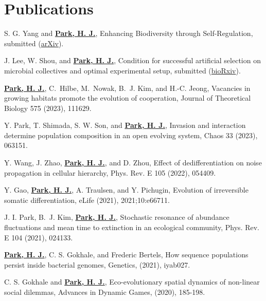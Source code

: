 \documentclass[11pt,a4paper,sans]{moderncv}        %
\begin{document}
\section{Publications}
\renewcommand{\labelenumi}{[\theenumi]} 
\begin{etaremune}
\item
S. G. Yang and \underline{\textbf{Park, H. J.}}, Enhancing Biodiversity through Self-Regulation, submitted (\href{https://arxiv.org/abs/2305.12341}{arXiv}).

\item
J. Lee, W. Shou, and \underline{\textbf{Park, H. J.}}, Condition for successful artificial selection on microbial collectives and optimal experimental setup, submitted (\href{https://www.biorxiv.org/content/10.1101/2023.03.07.531234v1.abstract}{bioRxiv}).

\item
\underline{\textbf{Park, H. J.}}, C.~Hilbe, M.~Nowak, B.~J. Kim, and H.-C. Jeong, Vacancies in growing habitats promote  the evolution of cooperation, Journal of Theoretical Biology 575 (2023), 111629.

\item
Y. Park, T. Shimada, S. W. Son, and \underline{\textbf{Park, H. J.}}, Invasion and interaction determine population composition in an open evolving system, Chaos 33 (2023), 063151.

\item
Y. Wang, J. Zhao, \underline{\textbf{Park, H. J.}}, and D. Zhou, Effect of dedifferentiation on noise propagation in cellular hierarchy,	Phys. Rev. E 105 (2022), 054409.

\item
Y. Gao, \underline{\textbf{Park, H. J.}}, A. Traulsen, and Y. Pichugin, Evolution of irreversible somatic differentiation, eLife (2021), 2021;10:e66711.

\item
J. I. Park, B.~J. Kim, \underline{\textbf{Park, H. J.}}, Stochastic resonance of abundance fluctuations and mean time to extinction in an ecological community,  Phys. Rev. E 104 (2021), 024133.

\item
\underline{\textbf{Park, H. J.}}, C. S. Gokhale, and Frederic Bertels, How sequence populations persist inside bacterial genomes, Genetics, (2021), iyab027.

\item
C. S. Gokhale and \underline{\textbf{Park, H. J.}},
Eco-evolutionary spatial dynamics of non-linear social dilemmas, Advances in Dynamic Games, (2020), 185-198.


\end{etaremune}
\end{document}
